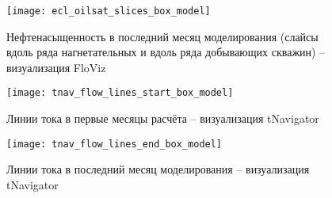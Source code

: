 \begin{figure}[H]
\center
\texttt{[image: ecl\_oilsat\_slices\_box\_model]}
\caption{Нефтенасыщенность в последний месяц моделирования (слайсы вдоль ряда нагнетательных и вдоль ряда добывающих скважин) -- визуализация FloViz}
\label{fig:ecl_oilsat_slices_box_model}
\end{figure}


\begin{figure}[H]
\center
\texttt{[image: tnav\_flow\_lines\_start\_box\_model]}
\caption{Линии тока в первые месяцы расчёта -- визуализация tNavigator}
\label{fig:tnav_flow_lines_start_box_model}
\end{figure}

\begin{figure}[H]
\center
\texttt{[image: tnav\_flow\_lines\_end\_box\_model]}
\caption{Линии тока в последний месяц моделирования -- визуализация tNavigator}
\label{fig:tnav_flow_lines_end_box_model}
\end{figure}


